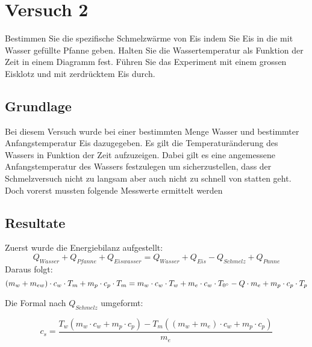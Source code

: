 \documentclass{article}
\begin{document}
\section{Versuch 2}
Bestimmen Sie die spezifische Schmelzwärme von Eis indem Sie Eis in die mit Wasser gefüllte Pfanne geben.
Halten Sie die Wassertemperatur als Funktion der Zeit in einem Diagramm fest. Führen Sie das Experiment
mit einem grossen Eisklotz und mit zerdrücktem Eis durch.
\subsection{Grundlage}
Bei diesem Versuch wurde bei einer bestimmten Menge Wasser und bestimmter Anfangstemperatur 
Eis dazugegeben. Es gilt die Temperaturänderung des Wassers in Funktion der Zeit aufzuzeigen. 
Dabei gilt es eine angemessene Anfangstemperatur des Wassers festzulegen um sicherzustellen, dass 
der Schmelzversuch nicht zu langsam aber auch nicht zu schnell von statten geht. Doch vorerst 
mussten folgende Messwerte ermittelt werden
\subsection{Resultate}
Zuerst wurde die Energiebilanz aufgestellt:
\begin{equation}
Q_{Wasser}+Q_{Pfanne}+Q_{Eiswasser} = Q_{Wasser}+Q_{Eis}-Q_{Schmelz}+Q_{Panne}
\end{equation}
Daraus folgt:
\begin{equation}
(m_{w}+m_{ew})\cdot c_{w}\cdot T_m+m_{p}\cdot c_{p}\cdot T_m= \\ m_{w} \cdot c_{w} \cdot T_{w}+ m_{e} \cdot c_{w} \cdot T_{0^\circ}-Q \cdot m_{e}+m_{p} \cdot c_{p} \cdot
 T_{p}
\end{equation}

Die Formal nach $Q_{Schmelz}$ umgeformt:

\begin{equation}
c_{s} = \frac{T_{w}(m_{w} \cdot c_{w}+m_{p} \cdot c_{p})-T_{m}((m_{w}+m_{e}) \cdot c_{w}+m_{p} \cdot c_{p})}{m_{e}}
\end{equation}
\end{document}
